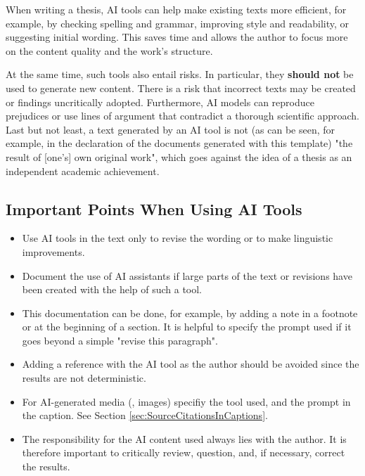 When writing a thesis, AI tools can help make existing texts more efficient,
for example, by checking spelling and grammar, improving style and readability,
or suggesting initial wording. This saves time and allows the author to focus
more on the content quality and the work's structure.

At the same time, such tools also entail risks. In particular, they
\textbf{should not} be used to generate new content. There is a risk that
incorrect texts may be created or findings uncritically adopted. Furthermore,
AI models can reproduce prejudices or use lines of argument that contradict a
thorough scientific approach. Last but not least, a text generated by an AI
tool is not (as can be seen, for example, in the declaration of the documents
generated with this template) "the result of [one's] own original work", which
goes against the idea of a thesis as an independent academic achievement.

\subsection{Important Points When Using AI Tools}

\begin{itemize}
	\item Use AI tools in the text only to revise the wording or to make
	linguistic improvements.
	\item Document the use of AI assistants if large parts of the text or
	revisions have been created with the help of such a tool.
	\item This documentation can be done, for example, by adding a note in a
	footnote or at the beginning of a section. It is helpful to specify the
	prompt used if it goes beyond a simple "revise this paragraph".
	\item Adding a reference with the AI tool as the author should be avoided
	since the results are not deterministic.
	\item For AI-generated media (\eg, images) specifiy the tool used, and the
	prompt in the caption. See Section \ref{sec:SourceCitationsInCaptions}.
	\item The responsibility for the AI content used always lies with the
	author. It is therefore important to critically review, question, and, if
	necessary, correct the results.
\end{itemize}
